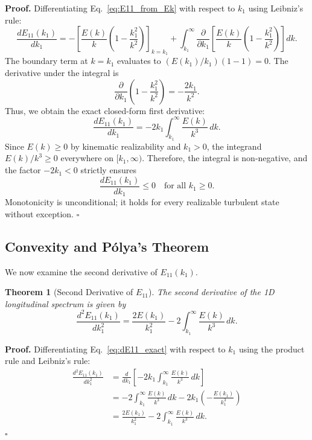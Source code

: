 \documentclass[lineno]{jfm}
\newtheorem{theorem}{Theorem}
\newenvironment{proof}[1][Proof]{\noindent\textbf{#1.} }{\hfill$\square$\medskip}
\begin{document}
\begin{proof}
Differentiating Eq.~\eqref{eq:E11_from_Ek} with respect to $k_1$ using Leibniz's rule:
\begin{equation}
\frac{d E_{11}(k_1)}{d k_1} = - \left[ \frac{E(k)}{k} \left( 1 - \frac{k_1^2}{k^2} \right) \right]_{k = k_1} + \int_{k_1}^\infty \frac{\partial}{\partial k_1} \left[ \frac{E(k)}{k} \left( 1 - \frac{k_1^2}{k^2} \right) \right] dk.
\end{equation}
The boundary term at $k = k_1$ evaluates to $(E(k_1)/k_1)(1 - 1) = 0$. The derivative under the integral is
\begin{equation}
\frac{\partial}{\partial k_1} \left( 1 - \frac{k_1^2}{k^2} \right) = -\frac{2 k_1}{k^2}.
\end{equation}
Thus, we obtain the exact closed-form first derivative:
\begin{equation}
\frac{d E_{11}(k_1)}{d k_1} = -2 k_1 \int_{k_1}^\infty \frac{E(k)}{k^3}\,dk.
\label{eq:dE11_exact}
\end{equation}
Since $E(k) \ge 0$ by kinematic realizability and $k_1 > 0$, the integrand $E(k)/k^3 \ge 0$ everywhere on $[k_1, \infty)$. Therefore, the integral is non-negative, and the factor $-2k_1 < 0$ strictly ensures
\begin{equation}
\frac{d E_{11}(k_1)}{d k_1} \le 0 \quad \text{for all } k_1 \ge 0.
\end{equation}
Monotonicity is unconditional; it holds for every realizable turbulent state without exception.
\end{proof}

\subsection{Convexity and P\'olya's Theorem}

We now examine the second derivative of $E_{11}(k_1)$.

\begin{theorem}[Second Derivative of $E_{11}$]
\label{thm:second_derivative}
The second derivative of the 1D longitudinal spectrum is given by
\begin{equation}
\frac{d^2 E_{11}(k_1)}{d k_1^2} = \frac{2 E(k_1)}{k_1^2} - 2 \int_{k_1}^\infty \frac{E(k)}{k^3}\,dk.
\label{eq:d2E11_exact}
\end{equation}
\end{theorem}

\begin{proof}
Differentiating Eq.~\eqref{eq:dE11_exact} with respect to $k_1$ using the product rule and Leibniz's rule:
\begin{align}
\frac{d^2 E_{11}(k_1)}{d k_1^2} &= \frac{d}{dk_1} \left[ -2 k_1 \int_{k_1}^\infty \frac{E(k)}{k^3}\,dk \right] \nonumber \\
&= -2 \int_{k_1}^\infty \frac{E(k)}{k^3}\,dk - 2 k_1 \left( - \frac{E(k_1)}{k_1^3} \right) \nonumber \\
&= \frac{2 E(k_1)}{k_1^2} - 2 \int_{k_1}^\infty \frac{E(k)}{k^3}\,dk.
\end{align}
\end{proof}
\end{document}
